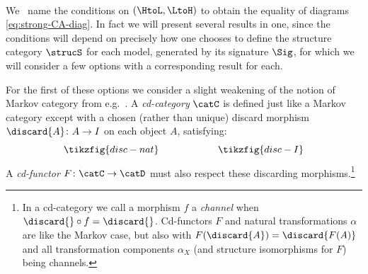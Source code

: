 \documentclass{article}
\begin{document}
\ 

We \ name the conditions on $(\HtoL,\LtoH)$ to obtain the equality of diagrams \eqref{eq:strong-CA-diag}. In fact we will present several results in one, since the conditions will depend on precisely how one chooses to define the structure category $\strucS$ for each model, generated by its signature $\Sig$, for which we will consider a few options with a corresponding result for each. 

For the first of these options we consider a slight weakening of the notion of Markov category from e.g.~\cite{cho2019disintegration}. A \emph{cd-category} $\catC$ is defined just like a Markov category except with a chosen (rather than unique) discard morphism $\discard{A} \colon A \to I$ on each object $A$, satisfying:
\[
\tikzfig{disc-nat} \qquad \qquad  \qquad \tikzfig{disc-I}
\]
A \emph{cd-functor} $F \colon \catC \to \catD$ must also respect these discarding morphisms.\footnote{ 
In a cd-category we call a morphism $f$ a \emph{channel} when $\discard{} \circ f = \discard{}$. Cd-functors $F$ and natural transformations $\alpha$ are like the Markov case, but also with $F(\discard{A}) = \discard{F(A)}$ and all transformation components $\alpha_X$ (and structure isomorphisms for $F$) being channels.}
\end{document}
